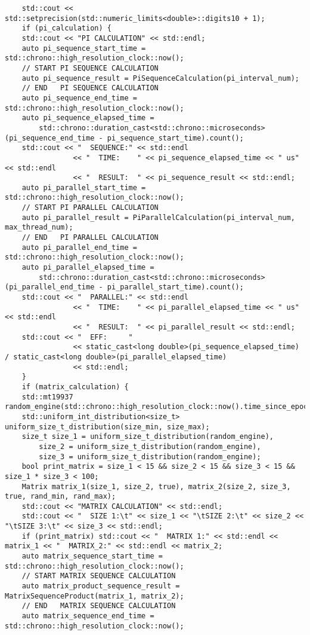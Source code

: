 \documentclass{report}
\begin{document}
\begin{lstlisting}
	std::cout << std::setprecision(std::numeric_limits<double>::digits10 + 1);
	if (pi_calculation) {
	std::cout << "PI CALCULATION" << std::endl;
	auto pi_sequence_start_time = std::chrono::high_resolution_clock::now();
	// START PI SEQUENCE CALCULATION
	auto pi_sequence_result = PiSequenceCalculation(pi_interval_num);
	// END   PI SEQUENCE CALCULATION
	auto pi_sequence_end_time = std::chrono::high_resolution_clock::now();
	auto pi_sequence_elapsed_time =
		std::chrono::duration_cast<std::chrono::microseconds>(pi_sequence_end_time - pi_sequence_start_time).count();
	std::cout << "  SEQUENCE:" << std::endl
				<< "  TIME:    " << pi_sequence_elapsed_time << " us" << std::endl
				<< "  RESULT:  " << pi_sequence_result << std::endl;
	auto pi_parallel_start_time = std::chrono::high_resolution_clock::now();
	// START PI PARALLEL CALCULATION
	auto pi_parallel_result = PiParallelCalculation(pi_interval_num, max_thread_num);
	// END   PI PARALLEL CALCULATION
	auto pi_parallel_end_time = std::chrono::high_resolution_clock::now();
	auto pi_parallel_elapsed_time =
		std::chrono::duration_cast<std::chrono::microseconds>(pi_parallel_end_time - pi_parallel_start_time).count();
	std::cout << "  PARALLEL:" << std::endl
				<< "  TIME:    " << pi_parallel_elapsed_time << " us" << std::endl
				<< "  RESULT:  " << pi_parallel_result << std::endl;
	std::cout << "  EFF:     "
				<< static_cast<long double>(pi_sequence_elapsed_time) / static_cast<long double>(pi_parallel_elapsed_time)
				<< std::endl;
	}
	if (matrix_calculation) {
	std::mt19937 random_engine(std::chrono::high_resolution_clock::now().time_since_epoch().count());
	std::uniform_int_distribution<size_t> uniform_size_t_distribution(size_min, size_max);
	size_t size_1 = uniform_size_t_distribution(random_engine),
		size_2 = uniform_size_t_distribution(random_engine),
		size_3 = uniform_size_t_distribution(random_engine);
	bool print_matrix = size_1 < 15 && size_2 < 15 && size_3 < 15 && size_1 * size_3 < 100;
	Matrix matrix_1(size_1, size_2, true), matrix_2(size_2, size_3, true, rand_min, rand_max);
	std::cout << "MATRIX CALCULATION" << std::endl;
	std::cout << "  SIZE 1:\t" << size_1 << "\tSIZE 2:\t" << size_2 << "\tSIZE 3:\t" << size_3 << std::endl;
	if (print_matrix) std::cout << "  MATRIX 1:" << std::endl << matrix_1 << "  MATRIX_2:" << std::endl << matrix_2;
	auto matrix_sequence_start_time = std::chrono::high_resolution_clock::now();
	// START MATRIX SEQUENCE CALCULATION
	auto matrix_product_sequence_result = MatrixSequenceProduct(matrix_1, matrix_2);
	// END   MATRIX SEQUENCE CALCULATION
	auto matrix_sequence_end_time = std::chrono::high_resolution_clock::now();

\end{lstlisting}
\end{document}
